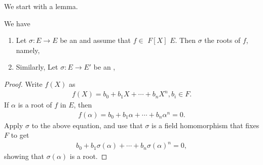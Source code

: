 \documentclass{article}
\begin{document}
We start with a lemma.
\begin{lema}\label{lem:oqnead}
We have 
\begin{enumerate}
    \item Let $\sigma: E \rightarrow E$ be an  and assume that $f \in$ $F[X]$  $E$. Then $\sigma$  the roots of $f$, namely,  
    \item Similarly, Let $\sigma: E \rightarrow E'$ be an ,  
\end{enumerate}
 

\end{lema}
\begin{proof}
Write $f(X)$ as
\begin{align*}
f(X)=b_{0}+b_{1} X+\cdots+b_{n} X^{n}, b_{i} \in F .
\end{align*}
If $\alpha$ is a root of $f$ in $E$, then
\begin{align*}
f(\alpha)=b_{0}+b_{1} \alpha+\cdots+b_{n} \alpha^{n}=0 .
\end{align*}
Apply $\sigma$ to the above equation, and use that $\sigma$ is a field homomorphism that fixes $F$ to get
\begin{align*}
b_{0}+b_{1} \sigma(\alpha)+\cdots+b_{n} \sigma(\alpha)^{n}=0,
\end{align*}
showing that $\sigma(\alpha)$ is a root.

\end{proof} 

\end{document}

